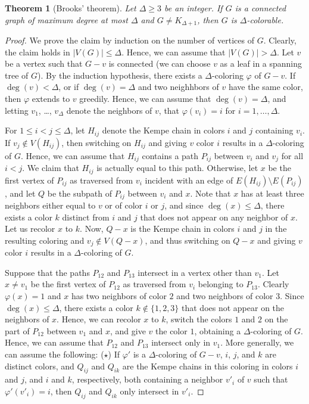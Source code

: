 \documentclass[12pt,twoside,openright,a4paper]{book}
\newtheorem{theorem}{Theorem}[chapter]
\begin{document}
\begin{theorem}[Brooks' theorem]\label{thm:brooks}
Let $\Delta\ge 3$ be an integer.
If $G$ is a connected graph of maximum degree at most $\Delta$ and $G\neq K_{\Delta+1}$,
then $G$ is $\Delta$-colorable.
\end{theorem}
\begin{proof}
We prove the claim by induction on the number of vertices of $G$.  Clearly, the claim holds in $|V(G)|\le \Delta$.
Hence, we can assume that $|V(G)|>\Delta$.  Let $v$ be a vertex such that $G-v$ is connected (we can choose $v$ as
a leaf in a spanning tree of $G$).  By the induction hypothesis, there exists a $\Delta$-coloring $\varphi$ of $G-v$.
If $\deg(v)<\Delta$, or if $\deg(v)=\Delta$ and two neighhbors of $v$ have the same color, then $\varphi$ extends to $v$ greedily.
Hence, we can assume that $\deg(v)=\Delta$, and letting $v_1$, \ldots, $v_\Delta$ denote the neighbors of $v$, that
$\varphi(v_i)=i$ for $i=1,\ldots,\Delta$.

For $1\le i<j\le \Delta$, let $H_{ij}$ denote the Kempe chain in colors $i$ and $j$ containing $v_i$.  If $v_j\not\in V(H_{ij})$,
then switching on $H_{ij}$ and giving $v$ color $i$ results in a $\Delta$-coloring of $G$.  Hence, we can assume that $H_{ij}$ contains
a path $P_{ij}$ between $v_i$ and $v_j$ for all $i<j$.  We claim that $H_{ij}$ is actually equal to this path.  Otherwise,
let $x$ be the first vertex of $P_{ij}$ as traversed from $v_i$ incident with an edge of $E(H_{ij})\setminus E(P_{ij})$, and let
$Q$ be the subpath of $P_{ij}$ between $v_i$ and $x$.  Note that $x$ has at least three neighbors either equal to $v$ or of color $i$ or $j$,
and since $\deg(x)\le\Delta$, there exists a color $k$ distinct from $i$ and $j$ that does not appear on any neighbor of $x$.
Let us recolor $x$ to $k$.  Now, $Q-x$ is the Kempe chain in colors $i$ and $j$ in the resulting coloring and $v_j\not\in V(Q-x)$,
and thus switching on $Q-x$ and giving $v$ color $i$ results in a $\Delta$-coloring of $G$.

Suppose that the paths $P_{12}$ and $P_{13}$ intersect in a vertex other than $v_1$.  Let $x\neq v_1$ be
the first vertex of $P_{12}$ as traversed from $v_i$ belonging to $P_{13}$.  Clearly $\varphi(x)=1$ and $x$ has two neighbors of color $2$
and two neighbors of color $3$.  Since $\deg(x)\le \Delta$, there exists a color $k\not\in\{1,2,3\}$ that does not appear on the neighbors of $x$.
Hence, we can recolor $x$ to $k$, switch the colors $1$ and $2$ on the part of $P_{12}$ between $v_1$ and $x$, and give $v$ the color $1$,
obtaining a $\Delta$-coloring of $G$.
Hence, we can assume that $P_{12}$ and $P_{13}$ intersect only in $v_1$.
More generally, we can assume the following: ($\star$) If $\varphi'$ is a $\Delta$-coloring of $G-v$, $i$, $j$, and $k$ are distinct colors,
and $Q_{ij}$ and $Q_{ik}$ are the Kempe chains in this coloring in colors $i$ and $j$, and $i$ and $k$, respectively, both containing
a neighbor $v'_i$ of $v$ such that $\varphi'(v'_i)=i$, then $Q_{ij}$ and $Q_{ik}$ only intersect in $v'_i$.


\end{proof}
\end{document}
